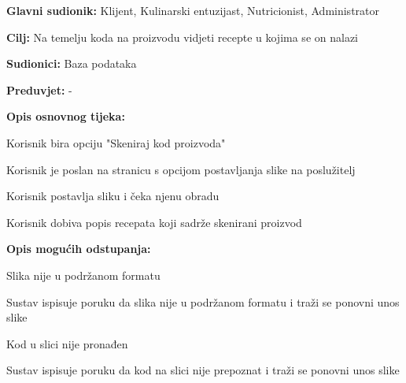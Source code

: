 					\noindent {}
					\begin{packed_item}
	
						\item \textbf{Glavni sudionik: }Klijent, Kulinarski entuzijast, Nutricionist, Administrator 
						\item  \textbf{Cilj:} Na temelju koda na proizvodu vidjeti recepte u kojima se on nalazi
						\item  \textbf{Sudionici:} Baza podataka
						\item  \textbf{Preduvjet:} -
						\item  \textbf{Opis osnovnog tijeka:} 
						
						\item[] \begin{packed_enum}
	
						\item Korisnik bira opciju "Skeniraj kod proizvoda"
						\item Korisnik je poslan na stranicu s opcijom postavljanja slike na poslužitelj
						\item Korisnik postavlja sliku i čeka njenu obradu
						\item Korisnik dobiva popis recepata koji sadrže skenirani proizvod
						\end{packed_enum}
						
						\item  \textbf{Opis mogućih odstupanja:}
						
						\item[] \begin{packed_item}
	
							\item[2.a] Slika nije u podržanom formatu
							\item[] \begin{packed_enum}
								
								\item Sustav ispisuje poruku da slika nije u podržanom formatu i traži se ponovni unos slike
								
							\end{packed_enum}							
							\item[2.b] Kod u slici nije pronađen
							\item[] \begin{packed_enum}
								
								\item Sustav ispisuje poruku da kod na slici nije prepoznat i traži se ponovni unos slike
								
							\end{packed_enum}

						\end{packed_item}
					\end{packed_item}



